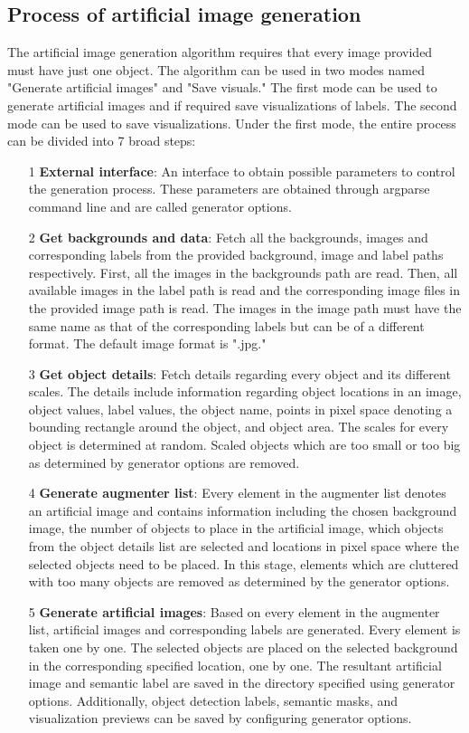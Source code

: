 \subsection{Process of artificial image generation}
The artificial image generation algorithm requires that every image provided must have just one object. The algorithm can be used in two modes named "Generate artificial images" and "Save visuals." The first mode can be used to generate artificial images and if required save visualizations of labels. The second mode can be used to save visualizations. Under the first mode, the entire process can be divided into 7 broad steps:
	\begin{itemize}
		\item[1] \textbf{External interface}: An interface to obtain possible parameters to control the generation process. These parameters are obtained through argparse command line and are called generator options.
		\item[2] \textbf{Get backgrounds and data}: Fetch all the backgrounds, images and corresponding labels from the provided background, image and label paths respectively. First, all the images in the backgrounds path are read. Then, all available images in the label path is read and the corresponding image files in the provided image path is read. The images in the image path must have the same name as that of the corresponding labels but can be of a different format. The default image format is ".jpg."
		\item[3] \textbf{Get object details}: Fetch details regarding every object and its different scales. The details include information regarding object locations in an image, object values, label values, the object name, points in pixel space denoting a bounding rectangle around the object, and object area. The scales for every object is determined at random. Scaled objects which are too small or too big as determined by generator options are removed.
		\item[4] \textbf{Generate augmenter list}: Every element in the augmenter list denotes an artificial image and contains information including the chosen background image, the number of objects to place in the artificial image, which objects from the object details list are selected and locations in pixel space where the selected objects need to be placed. In this stage, elements which are cluttered with too many objects are removed as determined by the generator options.
		\item[5] \textbf{Generate artificial images}: Based on every element in the augmenter list, artificial images and corresponding labels are generated. Every element is taken one by one. The selected objects are placed on the selected background in the corresponding specified location, one by one. The resultant artificial image and semantic label are saved in the directory specified using generator options. Additionally, object detection labels, semantic masks, and visualization previews can be saved by configuring generator options.

\end{itemize}
